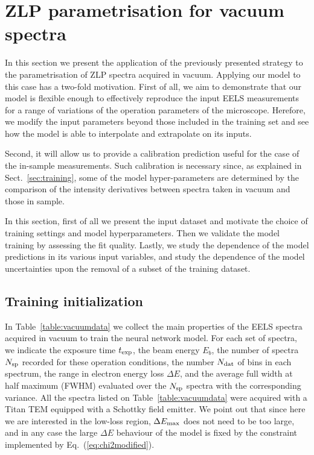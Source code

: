 \section{ZLP parametrisation for vacuum spectra}
\label{sec:results_vacuum}

In this section we present the application of the previously presented strategy 
to the parametrisation of ZLP spectra acquired in vacuum.
%
Applying our model to this case has a two-fold motivation.
%
First of all, we aim to demonstrate that our model is flexible enough to effectively reproduce the
input EELS measurements for a range of variations of the operation parameters of the microscope.
%
Herefore, we modify the input parameters beyond those included in the training set
and see how the model is able to interpolate and extrapolate on its inputs.

Second, it will allow us to provide a calibration prediction
useful for the case of the in-sample measurements.
%
Such calibration is necessary since, as explained in Sect.~\ref{sec:training}, some of the model
hyper-parameters are determined by the comparison of the intensity derivatives
between spectra taken in vacuum and those in sample.

In this section, first of all we present the input dataset and motivate the choice
of training settings and model hyperparameters.
%
Then we validate the model training by assessing the fit quality.
%
Lastly, we study the dependence of the model predictions in its various input
variables, and study the dependence of the model uncertainties upon
the removal of a subset of the training dataset.

\subsection{Training initialization}

In Table~\ref{table:vacuumdata} we collect the main properties of the EELS spectra acquired in vacuum to train the neural
    network model.  For each set of spectra, we indicate the exposure time $t_{\rm exp}$, the beam energy
    $E_b$, the number of spectra $N_{\rm sp}$ recorded for these operation conditions, the number $N_{\rm dat}$ of
    bins in each spectrum, the range in electron energy loss $\Delta E$,
    and the average full width at half maximum (FWHM)
    evaluated over the $N_{\rm sp}$ spectra with the corresponding variance.
    All the spectra listed on Table~\ref{table:vacuumdata}
    were acquired with a Titan TEM equipped with a Schottky field emitter.
    We point out that since here
    we are interested in the low-loss region, $\Delta E_{\rm max}$ does not need
    to be too large, and in any case the large $\Delta E$ behaviour of the model is fixed
    by the constraint implemented by Eq.~(\ref{eq:chi2modified}).

